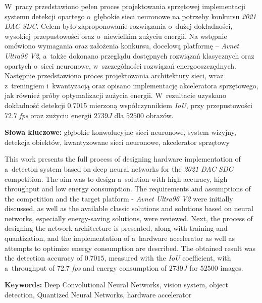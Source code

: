 \documentclass[12pt]{aghdpl}
\author{Michał Machura}
\date{2021}
\newenvironment{abstractpage}
{\cleardoublepage\vspace*{\fill}\thispagestyle{empty}}
{\vfill\cleardoublepage}
\renewenvironment{abstract}[1]
{\bigskip\selectlanguage{#1}%
    \begin{center}\bfseries\abstractname\end{center}}
{\par\bigskip}
\begin{document}
	\titlepages
	
	\begin{abstractpage}
    \begin{abstract}{polish}
        W~pracy przedstawiono pełen proces projektowania sprzętowej implementacji systemu detekcji opartego o~głębokie sieci neuronowe na potrzeby konkursu \emph{2021 DAC SDC}.
        Celem było zaproponowanie rozwiązania o~dużej dokładności, wysokiej przepustowości oraz o~niewielkim zużyciu energii. 
        Na wstępnie omówiono wymagania oraz założenia konkursu, docelową platformę -- \emph{Avnet Ultra96 V2}, a~także dokonano przeglądu dostępnych rozwiązań klasycznych oraz opartych o~sieci neuronowe, w~szczególności rozwiązań energooszczędnych. 
        Następnie przedstawiono proces projektowania architektury sieci, wraz z~treningiem i~kwantyzacją oraz opisano implementację akceleratora sprzętowego, jak również próby optymalizacji zużycia energii. 
        W~rezultacie uzyskano dokładność detekcji 0.7015 mierzoną współczynnikiem \emph{IoU}, przy przepustowości $72.7$ \emph{fps} oraz zużyciu energii $2739 J$ dla $52500$ obrazów.
        
        
        \bigskip
        \textbf{Słowa kluczowe:}   głębokie konwolucyjne sieci neuronowe, system wizyjny, detekcja obiektów, kwantyzowane sieci neuronowe, akcelerator sprzętowy
       
       
    \end{abstract}
    \bigskip
    \bigskip
    \bigskip
    \bigskip
    \bigskip
    \bigskip
    \bigskip
    \bigskip
    \bigskip
    \bigskip
    \bigskip
    \begin{abstract}{english}
        This work presents the full process of designing hardware implementation of a~detecton system based on deep neural networks for the \emph{2021 DAC SDC} competition.
        The aim was to design a~solution with high accuracy, high throughput and low energy consumption.
        The requirements and assumptions of the competition and the target platform - \emph{Avnet Ultra96 V2}  were initially discussed, as well as the available classic solutions and solutions based on neural networks, especially energy-saving solutions, were reviewed.
        Next, the process of designing the network architecture is presented, along with training and quantization, and the implementation of a~hardware accelerator as well as attempts to optimize energy consumption are described.
        The obtained result was the detection accuracy of $0.7015$, measured with the \emph{IoU} coefficient, with a~throughput of $72.7$ \emph{fps} and energy consumption of $2739 J$ for $52 500$ images. 
         \bigskip
       
        \textbf{Keywords:} Deep Convolutional Neural Networks, vision system, object detection, Quantized Neural Networks, hardware accelerator
    \end{abstract}
\end{abstractpage}
\end{document}
